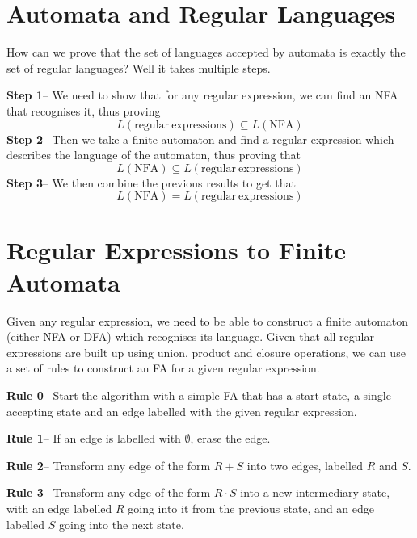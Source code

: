 
\section*{Automata and Regular Languages}

How can we prove that the set of languages accepted by automata is exactly the set of regular languages? Well it takes
 multiple steps.

\textbf{Step 1}-- We need to show that for any regular expression, we can find an NFA that recognises it, thus proving
\begin{equation*}
  L(\mathrm{regular\ expressions}) \subseteq L(\mathrm{NFA})
\end{equation*}
\textbf{Step 2}-- Then we take a finite automaton and find a regular expression which describes the language of the
 automaton, thus proving that
 \begin{equation*}
  L(\mathrm{NFA}) \subseteq L(\mathrm{regular\ expressions})
\end{equation*}
\textbf{Step 3}-- We then combine the previous results to get that
\begin{equation*}
  L(\mathrm{NFA}) = L(\mathrm{regular\ expressions})
\end{equation*}

\section*{Regular Expressions to Finite Automata}

Given any regular expression, we need to be able to construct a finite automaton (either NFA or DFA) which recognises
 its language. Given that all regular expressions are built up using union, product and closure operations, we can use
 a set of rules to construct an FA for a given regular expression.

\textbf{Rule 0}-- Start the algorithm with a simple FA that has a start state, a single accepting state and an edge
 labelled with the given regular expression.

\textbf{Rule 1}-- If an edge is labelled with $\emptyset$, erase the edge.

\textbf{Rule 2}-- Transform any edge of the form $R + S$ into two edges, labelled $R$ and $S$.

\textbf{Rule 3}-- Transform any edge of the form $R \cdot S$ into a new intermediary state, with an edge labelled $R$
 going into it from the previous state, and an edge labelled $S$ going into the next state.

